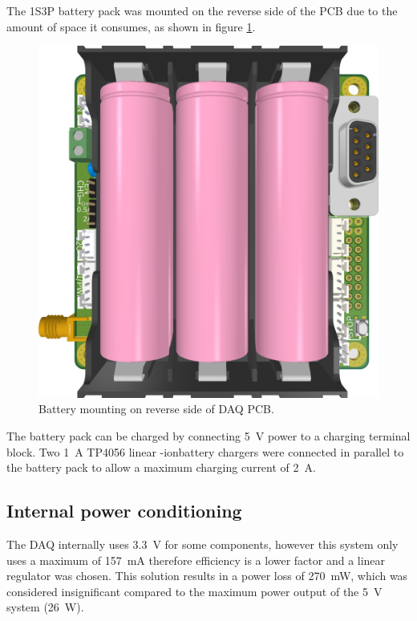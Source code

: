 \documentclass{report}
\newcommand{\liion}{\ce{Li}-ion}
\begin{document}
The 1S3P battery pack was mounted on the reverse side of the PCB due to the amount of space it consumes, as shown in figure \ref{fig:batteries-pcb}.

\begin{figure}[H]
  \centering
  \includegraphics[width=\linewidth]{images/batteries_PCB.png}
  \caption{Battery mounting on reverse side of DAQ PCB.}
  \label{fig:batteries-pcb}
\end{figure}

The battery pack can be charged by connecting \SI{5}{\volt} power to a charging terminal block. Two \SI{1}{\ampere} TP4056 linear \liion battery chargers were connected in parallel to the battery pack to allow a maximum charging current of \SI{2}{\ampere}.

\subsection{Internal power conditioning}

The DAQ internally uses \SI{3.3}{\volt} for some components, however this system only uses a maximum of \SI{157}{\milli\ampere} therefore efficiency is a lower factor and a linear regulator was chosen. This solution results in a power loss of \SI{270}{\milli\watt}, which was considered insignificant compared to the maximum power output of the \SI{5}{\volt} system (\SI{26}{\watt}). %
\end{document}
